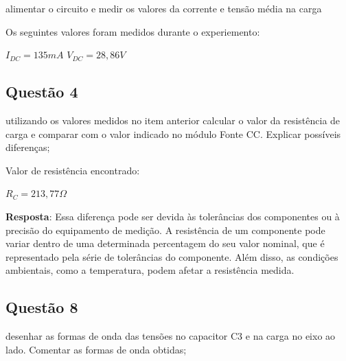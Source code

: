 \documentclass{article}
\begin{document}
\begin{tcolorbox}[title=\large Questão 3, colback=red!5!white, colframe=red!75!black]
    \large
    alimentar o circuito e medir os valores da corrente e tensão média na carga
\end{tcolorbox}

Os seguintes valores foram medidos durante o experiemento:

\begin{center}
    \begin{tcolorbox}[width=0.6\textwidth]
        \centering
        $I_{DC} = 135mA$
        \hspace{2cm}
        $V_{DC} = 28,86V$
    \end{tcolorbox}
\end{center}

\subsection{Questão 4}

\begin{tcolorbox}[title=\large Questão 4, colback=red!5!white, colframe=red!75!black]
    \large
    utilizando os valores medidos no item anterior calcular o valor da resistência de carga e comparar com o valor indicado no módulo Fonte CC. Explicar possíveis diferenças;
\end{tcolorbox}

Valor de resistência encontrado:
    
\begin{center}
    \begin{tcolorbox}[width=0.3\textwidth]
        \centering
        $R_{C} = 213,77\Omega$
    \end{tcolorbox}
\end{center}

\textbf{Resposta}: Essa diferença pode ser devida às tolerâncias dos componentes ou à precisão do equipamento de medição. A resistência de um componente pode variar dentro de uma determinada percentagem do seu valor nominal, que é representado pela série de tolerâncias do componente. Além disso, as condições ambientais, como a temperatura, podem afetar a resistência medida.

\subsection{Questão 8}

\begin{tcolorbox}[title=\large Questão 8, colback=red!5!white, colframe=red!75!black]
    \large
    desenhar as formas de onda das tensões no capacitor C3 e na carga no eixo ao lado. Comentar as formas de onda obtidas;
\end{tcolorbox}
\end{document}
